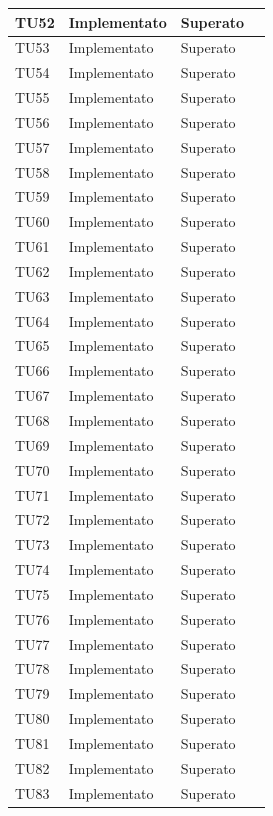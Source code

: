 \begin{longtable}{|>{\centering\arraybackslash}m{1.6cm}|>{\centering\arraybackslash}m{6.41cm}|>{\centering\arraybackslash}m{3.1cm}| c |}
	TU52 & Implementato & Superato  \\ \hline
	TU53 & Implementato & Superato  \\ \hline
	TU54 & Implementato & Superato  \\ \hline
	TU55 & Implementato & Superato  \\ \hline
	TU56 & Implementato & Superato  \\ \hline
	TU57 & Implementato & Superato  \\ \hline
	TU58 & Implementato & Superato  \\ \hline
	TU59 & Implementato & Superato  \\ \hline
	TU60 & Implementato & Superato  \\ \hline
	TU61 & Implementato & Superato  \\ \hline
	TU62 & Implementato & Superato  \\ \hline
	TU63 & Implementato & Superato  \\ \hline
	TU64 & Implementato & Superato  \\ \hline
	TU65 & Implementato & Superato  \\ \hline
	TU66 & Implementato & Superato  \\ \hline
	TU67 & Implementato & Superato  \\ \hline
	TU68 & Implementato & Superato  \\ \hline
	TU69 & Implementato & Superato  \\ \hline
	TU70 & Implementato & Superato  \\ \hline
	TU71 & Implementato & Superato  \\ \hline
	TU72 & Implementato & Superato  \\ \hline
	TU73 & Implementato & Superato  \\ \hline
	TU74 & Implementato & Superato  \\ \hline
	TU75 & Implementato & Superato  \\ \hline
	TU76 & Implementato & Superato  \\ \hline
	TU77 & Implementato & Superato  \\ \hline
	TU78 & Implementato & Superato  \\ \hline
	TU79 & Implementato & Superato  \\ \hline
	TU80 & Implementato & Superato  \\ \hline
	TU81 & Implementato & Superato  \\ \hline
	TU82 & Implementato & Superato  \\ \hline
	TU83 & Implementato & Superato  \\ \hline

\end{longtable}
